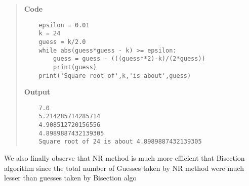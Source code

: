\documentclass[11pt]{article}
\begin{document}
\begin{enumerate}
\begin{quote}
                \textbf{Code}
\begin{verbatim}
    epsilon = 0.01
    k = 24
    guess = k/2.0
    while abs(guess*guess - k) >= epsilon:
        guess = guess - (((guess**2)-k)/(2*guess))
        print(guess)
    print('Square root of',k,'is about',guess)
\end{verbatim}
                \textbf{Output} 
\begin{verbatim}
    7.0
    5.214285714285714
    4.908512720156556
    4.8989887432139305
    Square root of 24 is about 4.8989887432139305
\end{verbatim}
            \end{quote}
            We also finally observe that NR method is much more efficient that Bisection algorithm since
            the total number of Guesses taken by NR method were much lesser than guesses taken by Bisection algo
    \end{enumerate}
\end{document}
